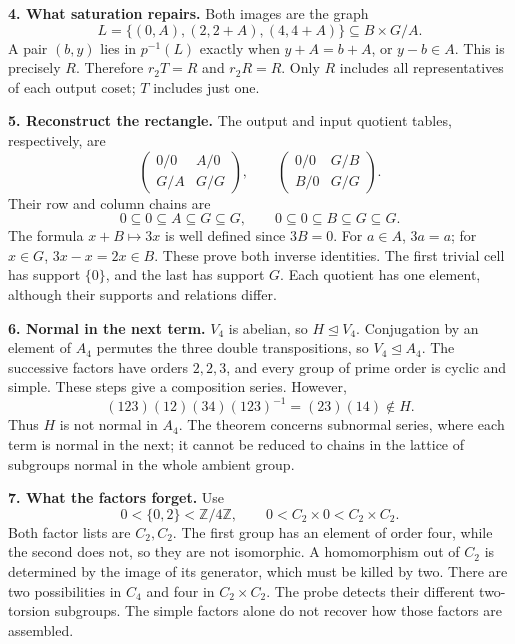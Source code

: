 \documentclass[11pt]{article}
\newcommand{\Z}{\mathbb Z}
\newcommand{\nml}{\trianglelefteq}
\begin{document}
\clearpage
\textbf{4. What saturation repairs.}
Both images are the graph
\[
 L=\{(0,A),(2,2+A),(4,4+A)\}\subseteq B\times G/A.
\]
A pair \((b,y)\) lies in \(p^{-1}(L)\) exactly when \(y+A=b+A\),
or \(y-b\in A\). This is precisely \(R\). Therefore
\(r_2T=R\) and \(r_2R=R\). Only \(R\) includes all representatives
of each output coset; \(T\) includes just one.

\medskip
\textbf{5. Reconstruct the rectangle.}
The output and input quotient tables, respectively, are
\[
 \begin{pmatrix}0/0&A/0\\G/A&G/G\end{pmatrix},
 \qquad
 \begin{pmatrix}0/0&G/B\\B/0&G/G\end{pmatrix}.
\]
Their row and column chains are
\[
 0\subseteq0\subseteq A\subseteq G\subseteq G,\qquad
 0\subseteq0\subseteq B\subseteq G\subseteq G.
\]
The formula \(x+B\mapsto3x\) is well defined since \(3B=0\).
For \(a\in A\), \(3a=a\); for \(x\in G\), \(3x-x=2x\in B\).
These prove both inverse identities. The first trivial cell has support
\(\{0\}\), and the last has support \(G\). Each quotient has one element,
although their supports and relations differ.

\medskip
\textbf{6. Normal in the next term.}
\(V_4\) is abelian, so \(H\nml V_4\). Conjugation by an element of
\(A_4\) permutes the three double transpositions, so \(V_4\nml A_4\).
The successive factors have orders \(2,2,3\), and every group of prime
order is cyclic and simple. These steps give a composition series.
However,
\[
 (123)(12)(34)(123)^{-1}=(23)(14)\notin H.
\]
Thus \(H\) is not normal in \(A_4\). The theorem concerns subnormal
series, where each term is normal in the next; it cannot be reduced to
chains in the lattice of subgroups normal in the whole ambient group.

\medskip
\textbf{7. What the factors forget.}
Use
\[
 0<\{0,2\}<\Z/4\Z,\qquad
 0<C_2\times0<C_2\times C_2.
\]
Both factor lists are \(C_2,C_2\). The first group has an element of order
four, while the second does not, so they are not isomorphic.
A homomorphism out of \(C_2\) is determined by the image of its generator,
which must be killed by two. There are two possibilities in \(C_4\)
and four in \(C_2\times C_2\). The probe detects their different
two-torsion subgroups. The simple factors alone do not recover how those
factors are assembled.

\end{document}
